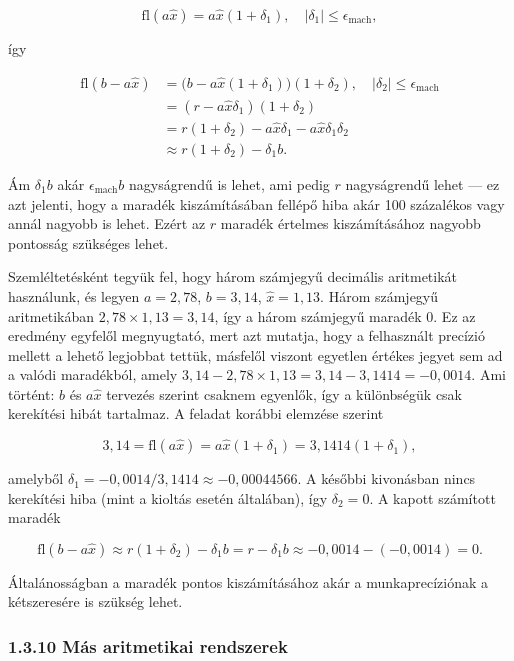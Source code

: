 \documentclass[
  magyar,
  11pt]{article}
\begin{document}
\[\mathrm{fl}(a\hat{x}) = a\hat{x}(1 + \delta_1), \quad |\delta_1| \le \epsilon_{\text{mach}},\]

így

\[\begin{aligned}
\mathrm{fl}(b - a\hat{x}) &= \bigl(b - a\hat{x}(1 + \delta_1)\bigr)(1 + \delta_2), \quad |\delta_2| \le \epsilon_{\text{mach}} \\
&= (r - a\hat{x}\delta_1)(1 + \delta_2) \\
&= r(1 + \delta_2) - a\hat{x}\delta_1 - a\hat{x}\delta_1\delta_2 \\
&\approx r(1 + \delta_2) - \delta_1 b.
\end{aligned}\]

Ám \(\delta_1 b\) akár \(\epsilon_{\text{mach}} b\) nagyságrendű is
lehet, ami pedig \(r\) nagyságrendű lehet --- ez azt jelenti, hogy a
maradék kiszámításában fellépő hiba akár 100 százalékos vagy annál
nagyobb is lehet. Ezért az \(r\) maradék értelmes kiszámításához nagyobb
pontosság szükséges lehet.

Szemléltetésként tegyük fel, hogy három számjegyű decimális aritmetikát
használunk, és legyen \(a = 2{,}78\), \(b = 3{,}14\),
\(\hat{x} = 1{,}13\). Három számjegyű aritmetikában
\(2{,}78 \times 1{,}13 = 3{,}14\), így a három számjegyű maradék \(0\).
Ez az eredmény egyfelől megnyugtató, mert azt mutatja, hogy a
felhasznált precízió mellett a lehető legjobbat tettük, másfelől viszont
egyetlen értékes jegyet sem ad a valódi maradékból, amely
\(3{,}14 - 2{,}78 \times 1{,}13 = 3{,}14 - 3{,}1414 = -0{,}0014\). Ami
történt: \(b\) és \(a\hat{x}\) tervezés szerint csaknem egyenlők, így a
különbségük csak kerekítési hibát tartalmaz. A feladat korábbi elemzése
szerint

\[3{,}14 = \mathrm{fl}(a\hat{x}) = a\hat{x}(1 + \delta_1) = 3{,}1414(1 + \delta_1),\]

amelyből \(\delta_1 = -0{,}0014/3{,}1414 \approx -0{,}00044566\). A
későbbi kivonásban nincs kerekítési hiba (mint a kioltás esetén
általában), így \(\delta_2 = 0\). A kapott számított maradék

\[\mathrm{fl}(b - a\hat{x}) \approx r(1 + \delta_2) - \delta_1 b = r - \delta_1 b \approx -0{,}0014 - (-0{,}0014) = 0.\]

Általánosságban a maradék pontos kiszámításához akár a munkaprecíziónak
a kétszeresére is szükség lehet.

\subsubsection{1.3.10 Más aritmetikai
rendszerek}\label{muxe1s-aritmetikai-rendszerek}
\end{document}
